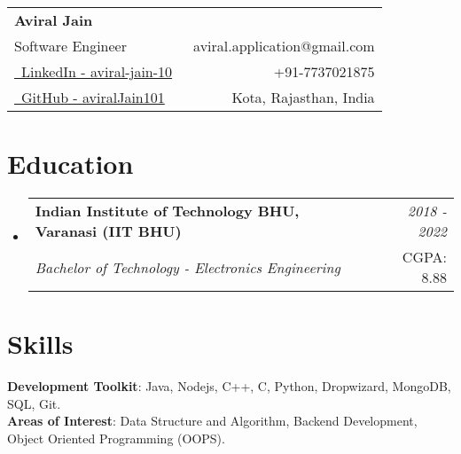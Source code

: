 \documentclass[a4paper,12pt]{article}
\makeatletter
\newcommand{\resumeSubheading}[4]{
\vspace{0.5mm}\item[]
    \begin{tabular*}{0.98\textwidth}[t]{l@{\extracolsep{\fill}}r}
        \textbf{#1} & \textit{\footnotesize{#4}} \\
        \textit{\footnotesize{#3}} &  \footnotesize{#2}\\
    \end{tabular*}
    \vspace{-1.0mm}
}
\newcommand{\resumeSubHeadingListStart}{\begin{itemize}[leftmargin=*,labelsep=0mm]}
\newcommand{\resumeSubHeadingListEnd}{\end{itemize}\vspace{2mm}}
\newcommand{\name}{Aviral Jain} %
\newcommand{\phone}{7737021875} %
\newcommand{\emaila}{aviral.application@gmail.com} %
\makeatother
\begin{document}


\parbox{\dimexpr\linewidth-0.5cm\relax}{
\begin{tabularx}{\linewidth}{L r} \\
  \textbf{\Large \name}\\
  {Software Engineer} & \raisebox{0.0\height}{\footnotesize \faEnvelope}\ {\emaila} \\
  \href{https://www.linkedin.com/in/aviral-jain-10/}{\raisebox{0.0\height}{\footnotesize \faLinkedin}\ LinkedIn - aviral-jain-10} &  {\raisebox{0.0\height}{\footnotesize \faPhone}\ +91-\phone} \\
  \href{https://github.com/aviralJain101}{\raisebox{0.0\height}{\footnotesize \faGithub}\ {GitHub - aviralJain101}}& {\raisebox{0.0\height}{\footnotesize}\ Kota, Rajasthan, India}\\
\end{tabularx}
}

\section{\textbf{Education}}
  \resumeSubHeadingListStart
    \resumeSubheading
      {Indian Institute of Technology BHU, Varanasi (IIT BHU)}{CGPA: 8.88}
      {Bachelor of Technology - Electronics Engineering}{2018 - 2022}
  \resumeSubHeadingListEnd
\vspace{-5.5mm}
%


\section{\textbf{Skills}}
 \begin{itemize}[leftmargin=0.05in, label={}]
    \small{\item{
     \textbf{Development Toolkit}{: Java, Nodejs, C++, C, Python, Dropwizard, MongoDB, SQL, Git.} \\
         \vspace{2pt}
     \textbf{Areas of Interest}{: Data Structure and Algorithm, Backend Development, Object Oriented Programming (OOPS).}
    }}
 \end{itemize}
 \vspace{-12pt}



\end{document}
